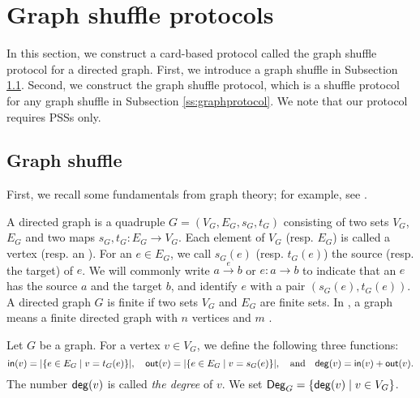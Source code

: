 \section{Graph shuffle protocols}\label{s:graph}

In this section, we construct a card-based protocol called  the graph shuffle protocol for a directed graph.
First, we introduce a graph shuffle in Subsection \ref{ss:graph}. Second, we construct the graph shuffle protocol, which is a shuffle protocol for any graph shuffle in Subsection \ref{ss:graphprotocol}. We note that our protocol requires PSSs only. 


\subsection{Graph shuffle}\label{ss:graph}
First, we recall some fundamentals from graph theory; for example, see \cite{CLZ}.

A directed graph is a quadruple $G=(V_G,E_G,s_G,t_G)$ consisting of two sets $V_G$, $E_G$ and two maps $s_G,t_G:E_G\to V_G$.
Each element of $V_G$ (resp. $E_G$) is called a vertex (resp. an ). 
For an  $e\in E_G$, we call $s_G(e)$ (resp. $t_G(e)$) the source (resp. the target) of $e$. We will commonly write $a\xrightarrow{e}b$ or $e:a\to b$ to indicate that an  $e$ has the source $a$ and the target $b$, and identify $e$ with a pair $(s_G(e),t_G(e))$.
A directed graph $G$ is finite if two sets $V_G$ and $E_G$ are finite sets. 
In , a graph means a finite directed graph with $n$ vertices and $m$ .

Let $G$ be a graph.
For a vertex  $v\in V_G$, we define the following three functions:
\[ \mathsf{in}(v)=|\{e\in E_G\mid v=t_G(e)\}|,\quad \mathsf{out}(v)=|\{e\in E_G \mid v=s_G(e)\}|, \quad\text{and}\quad \mathsf{deg}(v)=\mathsf{in}(v)+\mathsf{out}(v).\]
The number $\mathsf{deg}(v)$ is called \textit{the degree} of $v$.
We set $\mathsf{Deg}_G = \{\mathsf{deg}(v) \mid v \in V_G\}$.

